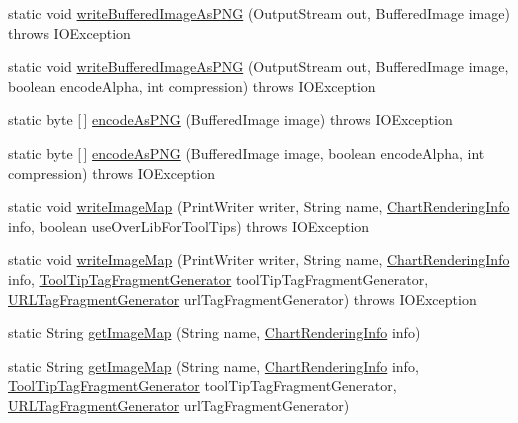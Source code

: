 \begin{DoxyCompactItemize}
static void \mbox{\hyperlink{classorg_1_1jfree_1_1chart_1_1_chart_utilities_a110c22e16a65440a144172bd7f5a4759}{write\+Buffered\+Image\+As\+P\+NG}} (Output\+Stream out, Buffered\+Image image)  throws I\+O\+Exception 
\item 
static void \mbox{\hyperlink{classorg_1_1jfree_1_1chart_1_1_chart_utilities_a80d51edbbe62eafaa700f2fc9899fe57}{write\+Buffered\+Image\+As\+P\+NG}} (Output\+Stream out, Buffered\+Image image, boolean encode\+Alpha, int compression)  throws I\+O\+Exception 
\item 
static byte \mbox{[}$\,$\mbox{]} \mbox{\hyperlink{classorg_1_1jfree_1_1chart_1_1_chart_utilities_aa02ad68b741fa60568d98b9091aa2fc8}{encode\+As\+P\+NG}} (Buffered\+Image image)  throws I\+O\+Exception 
\item 
static byte \mbox{[}$\,$\mbox{]} \mbox{\hyperlink{classorg_1_1jfree_1_1chart_1_1_chart_utilities_a8532e79d6a3348f62234a8410339057b}{encode\+As\+P\+NG}} (Buffered\+Image image, boolean encode\+Alpha, int compression)  throws I\+O\+Exception 
\item 
static void \mbox{\hyperlink{classorg_1_1jfree_1_1chart_1_1_chart_utilities_affa0950c03d038d50e73fdcb6364b67f}{write\+Image\+Map}} (Print\+Writer writer, String name, \mbox{\hyperlink{classorg_1_1jfree_1_1chart_1_1_chart_rendering_info}{Chart\+Rendering\+Info}} info, boolean use\+Over\+Lib\+For\+Tool\+Tips)  throws I\+O\+Exception 
\item 
static void \mbox{\hyperlink{classorg_1_1jfree_1_1chart_1_1_chart_utilities_ad6288a688b24de27adf5d7a2b12e835f}{write\+Image\+Map}} (Print\+Writer writer, String name, \mbox{\hyperlink{classorg_1_1jfree_1_1chart_1_1_chart_rendering_info}{Chart\+Rendering\+Info}} info, \mbox{\hyperlink{interfaceorg_1_1jfree_1_1chart_1_1imagemap_1_1_tool_tip_tag_fragment_generator}{Tool\+Tip\+Tag\+Fragment\+Generator}} tool\+Tip\+Tag\+Fragment\+Generator, \mbox{\hyperlink{interfaceorg_1_1jfree_1_1chart_1_1imagemap_1_1_u_r_l_tag_fragment_generator}{U\+R\+L\+Tag\+Fragment\+Generator}} url\+Tag\+Fragment\+Generator)  throws I\+O\+Exception 
\item 
static String \mbox{\hyperlink{classorg_1_1jfree_1_1chart_1_1_chart_utilities_af815b2a49f9b7ed61227d6a6215f981a}{get\+Image\+Map}} (String name, \mbox{\hyperlink{classorg_1_1jfree_1_1chart_1_1_chart_rendering_info}{Chart\+Rendering\+Info}} info)
\item 
static String \mbox{\hyperlink{classorg_1_1jfree_1_1chart_1_1_chart_utilities_a21022ade79935bce5d8b4b74070bfc4e}{get\+Image\+Map}} (String name, \mbox{\hyperlink{classorg_1_1jfree_1_1chart_1_1_chart_rendering_info}{Chart\+Rendering\+Info}} info, \mbox{\hyperlink{interfaceorg_1_1jfree_1_1chart_1_1imagemap_1_1_tool_tip_tag_fragment_generator}{Tool\+Tip\+Tag\+Fragment\+Generator}} tool\+Tip\+Tag\+Fragment\+Generator, \mbox{\hyperlink{interfaceorg_1_1jfree_1_1chart_1_1imagemap_1_1_u_r_l_tag_fragment_generator}{U\+R\+L\+Tag\+Fragment\+Generator}} url\+Tag\+Fragment\+Generator)
\end{DoxyCompactItemize}


